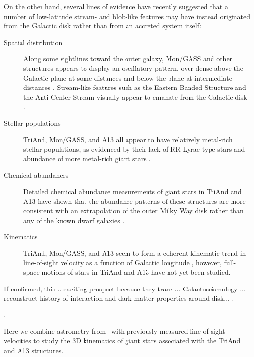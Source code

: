 \documentclass[twocolumn]{aastex62}
\newcommand{\gaia}{\project{Gaia}}
\begin{document}
On the other hand, several lines of evidence have recently suggested that a
number of low-latitude stream- and blob-like features may have instead
originated from the Galactic disk rather than from an accreted system itself:
\begin{description}
    \item[Spatial distribution]
        Along some sightlines toward the outer galaxy, Mon/GASS and other
        structures appears to display an oscillatory pattern, over-dense above
        the Galactic plane at some distances and below the plane at intermediate
        distances \citep[e.g.,][]{Newberg:2002, Xu:2015, TODO}.
        Stream-like features such as the Eastern Banded Structure
        \citep[EBS;][]{TODO} and the Anti-Center Stream \citep[ACS;][]{TODO}
        visually appear to emanate from the Galactic disk \citep[e.g., see
        Figure~XX and text in ][]{Slater:TODO}.
    \item[Stellar populations]
        TriAnd, Mon/GASS, and A13 all appear to have relatively metal-rich
        stellar populations, as evidenced by their lack of RR Lyrae-type stars
        and abundance of more metal-rich giant stars \citep{Price-Whelan:2015,
        Sheffield:TODO}.
    \item[Chemical abundances]
        Detailed chemical abundance measurements of giant stars in TriAnd and
        A13 have shown that the abundance patterns of these structures are more
        consistent with an extrapolation of the outer Milky Way disk rather than
        any of the known dwarf galaxies \citep{Bergemann:2018, Hayes:2018}.
    \item[Kinematics]
        TriAnd, Mon/GASS, and A13 seem to form a coherent kinematic trend in
        line-of-sight velocity as a function of Galactic longitude \citep{TODO,
        Johnston:2017}, however, full-space motions of stars in TriAnd and A13
        have not yet been studied.
\end{description}
If confirmed, this .. exciting prospect because they trace ... Galactoseismology
... reconstruct history of interaction and dark matter properties around disk...
\citep[e.g.,][]{Chakrabarti:TODO, Laporte:TODO}.

\citep[for a recent review, see][]{Johnston:2017}.

Here we combine astrometry from \gaia\ with previously measured line-of-sight
velocities to study the 3D kinematics of giant stars associated with the TriAnd
and A13 structures.
\end{document}
